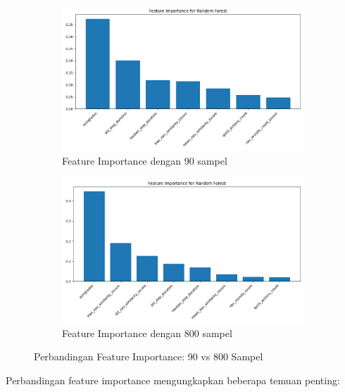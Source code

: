 \begin{figure}[htbp]
    \centering
    \begin{subfigure}{0.48\textwidth}
        \centering
        \includegraphics[width=\textwidth]{figures/feature_importance_90.png}
        \caption{Feature Importance dengan 90 sampel}
        \label{fig:feature_importance_90}
    \end{subfigure}
    \hfill
    \begin{subfigure}{0.48\textwidth}
        \centering
        \includegraphics[width=\textwidth]{figures/feature_importance_800.png}
        \caption{Feature Importance dengan 800 sampel}
        \label{fig:feature_importance_800}
    \end{subfigure}
    \caption{Perbandingan Feature Importance: 90 vs 800 Sampel}
    \label{fig:feature_importance_comparison}
\end{figure}

Perbandingan feature importance mengungkapkan beberapa temuan penting:

